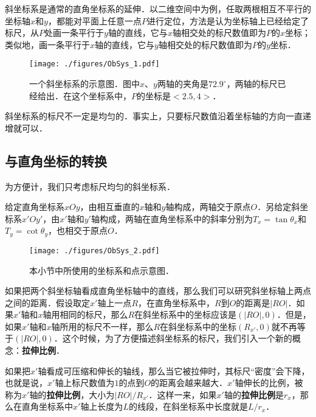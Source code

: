 

斜坐标系是通常的直角坐标系的延伸．以二维空间中为例，任取两根相互不平行的坐标轴$x$和$y$，都能对平面上任意一点$P$进行定位，方法是认为坐标轴上已经给定了标尺，从$P$处画一条平行于$y$轴的直线，它与$x$轴相交处的标尺数值即为$P$的$x$坐标；类似地，画一条平行于$x$轴的直线，它与$y$轴相交处的标尺数值即为$P$的$y$坐标．

\begin{figure}[ht]
\centering
\texttt{[image: ./figures/ObSys\_1.pdf]}
\caption{一个斜坐标系的示意图．图中$x$、$y$两轴的夹角是$72.9^\circ$，两轴的标尺已经给出．在这个坐标系中，$P$的坐标是$<2.5, 4>$．} \label{ObSys_fig1}
\end{figure}

斜坐标系的标尺不一定是均匀的．事实上，只要标尺数值沿着坐标轴的方向一直递增就可以．

\subsection{与直角坐标的转换}

为方便计，我们只考虑标尺均匀的斜坐标系．

给定直角坐标系$xOy$，由相互垂直的$x$轴和$y$轴构成，两轴交于原点$O$．另给定斜坐标系$x'Oy'$，由$x'$轴和$y'$轴构成，两轴在直角坐标系中的斜率分别为$T_x=\tan{\theta_x}$和$T_y=\cot{\theta_y}$，也相交于原点$O$．

\begin{figure}[ht]
\centering
\texttt{[image: ./figures/ObSys\_2.pdf]}
\caption{本小节中所使用的坐标系和点示意图．} \label{ObSys_fig2}
\end{figure}

如果把两个斜坐标轴看成直角坐标轴中的直线，那么我们可以研究斜坐标轴上两点之间的距离．假设取定$x'$轴上一点$R$，在直角坐标系中，$R$到$O$的距离是$|RO|$．如果$x'$轴和$x$轴用相同的标尺，那么$R$在斜坐标系中的坐标应该是$(|RO|, 0)$．但是，如果$x'$轴和$x$轴所用的标尺不一样，那么$R$在斜坐标系中的坐标$(R_{x'},0)$就不再等于$(|RO|, 0)$．这个时候，为了方便描述斜坐标系的标尺，我们引入一个新的概念：\textbf{拉伸比例}．

如果把$x'$轴看成可压缩和伸长的轴线，那么当它被拉伸时，其标尺“密度”会下降，也就是说，$x'$轴上标尺数值为$1$的点到$O$的距离会越来越大．$x'$轴伸长的比例，被称为$x'$轴的\textbf{拉伸比例}，大小为$|RO|/R_{x'}$．这样一来，如果$x'$轴的\textbf{拉伸比例}是$r_x$，那么在直角坐标系中$x'$轴上长度为$L$的线段，在斜坐标系中长度就是$L/r_x$．

